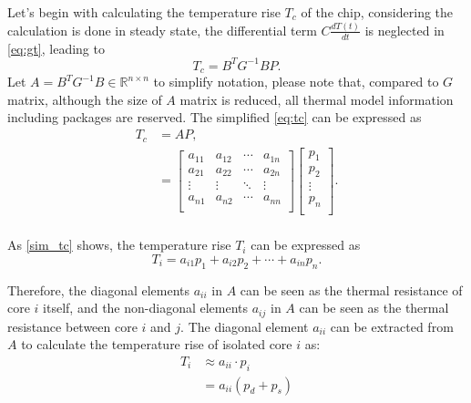 Let's begin with calculating the temperature rise $T_{c}$ of the chip, considering the calculation is done in steady state, the differential term $C\frac{dT(t)}{dt}$ is neglected in \eqref{eq:gt}, leading to
\begin{equation}\label{eq:tc}
T_{c} = B^{T}G^{-1}BP.
\end{equation}
Let $A = B^{T}G^{-1}B \in \mathbb{R}^{n \times n}$ to simplify notation, please note that, compared to $G$ matrix, although the size of $A$ matrix is reduced, all thermal model information including packages are reserved. The simplified 
\eqref{eq:tc} can be expressed as
\begin{equation}\label{sim_tc}
\begin{split}
T_{c} &= AP,\\
&=
{\left[
\begin{matrix}
 a_{11} & a_{12} & \cdots & a_{1n} \\
 a_{21} & a_{22} & \cdots & a_{2n} \\
 \vdots & \vdots & \ddots & \vdots \\
 a_{n1} & a_{n2} & \cdots & a_{nn} \\
\end{matrix}
\right]}
{\left[
\begin{matrix}
 p_{1}   \\
 p_{2}   \\
 \vdots  \\
 p_{n}   \\
\end{matrix}
\right]}.\\
\end{split}
\end{equation}

As \eqref{sim_tc} shows, the temperature rise $T_{i}$ can be expressed as
\begin{equation}\label{eq:ti}
T_{i} =a_{i1}p_{1} + a_{i2}p_{2} +\cdots + a_{in}p_{n}. 
\end{equation}

Therefore, the diagonal elements $a_{ii}$ in $A$ can be seen as the thermal resistance of core $i$ itself, and the non-diagonal elements $a_{ij}$ in $A$ can be seen as the thermal resistance between core $i$ and $j$. The diagonal element $a_{ii}$ can be extracted from $A$ to calculate the temperature rise of isolated core $i$ as:
\begin{equation}\label{eq:t_ap}
\begin{split}
T_{i}&\approx a_{ii} \cdot p_{i}\\
&=a_{ii}(p_{d}+p_{s})
\end{split}
\end{equation}


